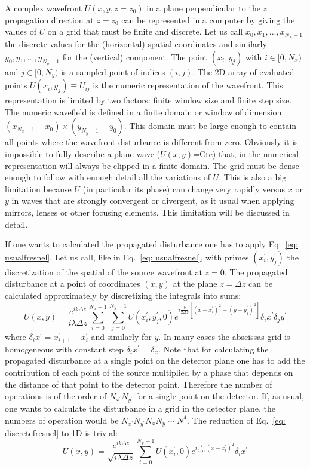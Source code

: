 \documentclass{iucr}              %
\begin{document}
A complex wavefront $U(x,y,z=z_0)$ in a plane perpendicular to the $z$ propagation direction at $z=z_0$ can be represented in a computer by giving the values of $U$ on a grid that must be finite and discrete. Let us call ${x_0,x_1,...,x_{N_x-1}}$ the discrete values for the (horizontal) spatial coordinates and similarly  ${y_0,y_1,...,y_{N_y-1}}$ for the (vertical) component. The point $(x_i,y_j)$ with $i \in [0,N_x)$ and  $j \in [0,N_y)$ is a sampled point of indices $(i,j)$. The 2D array of evaluated points $U(x_i,y_j) \equiv U_{ij}$ is the numeric representation of the wavefront. This representation is limited by two factors: finite window size and finite step size. The numeric wavefield is defined in a finite domain or window of dimension $(x_{N_x-1}-x_0) \times (y_{N_y-1}-y_0)$. This domain must be large enough to contain all points where the wavefront disturbance is different from zero. Obviously it is impossible to fully describe a plane wave ($U(x,y)$=Cte) that, in the numerical representation will always be clipped in a finite domain. The grid must be dense enough to follow with enough detail all the variations of $U$. This is also a big limitation because $U$ (in particular its phase) can change very rapidly versus $x$ or $y$ in waves that are strongly convergent or divergent, as it usual when applying mirrors, lenses or other focusing elements. This limitation will be discussed in detail. 

If one wants to calculated the propagated disturbance one has to apply Eq.~\ref{eq: usualfresnel}. Let us call, like in Eq.~\ref{eq: usualfresnel}, with primes $(x^\prime_i,y^\prime_j)$ the discretization of the spatial of the source wavefront at $z=0$. The propagated disturbance at a point of coordinates $(x,y)$ at the plane $z=\Delta z$ can be calculated approximately by discretizing the integrals into sums: 
\begin{equation}\label{eq: discretefresnel}
 U(x,y) = \frac {e^{ik\Delta z }}{ i \lambda \Delta z} \sum_{i=0}^{N_x-1}  \sum_{j=0}^{N_y-1} U(x^\prime_i, y^\prime_j, 0) e^{i \frac{k}{2 \Delta z} [(x - x_i^\prime)^2 + (y - y_j^\prime)^2]} \delta_i x^\prime \delta_j y^\prime
\end{equation}
where $\delta_i x^\prime = x^\prime_{i+1} - x^\prime_i$ and similarly for $y$. In many cases the abscissas grid is homogeneous with constant step $\delta_i x^\prime = \delta_x$. Note that for calculating the propagated disturbance at a single point on the detector plane one has to add the contribution of each point of the source multiplied by a phase that depends on the distance of that point to the detector point. Therefore the number of operations is of the order of $N_{x^\prime}  N_{y^\prime}$ for a single point on the detector. If, as usual, one wants to calculate the disturbance in a grid in the detector plane, the numbers of operation would be $N_{x^\prime}  N_{y^\prime} N_{x}  N_{y} \sim N^4$. 
The reduction of Eq.~\ref{eq: discretefresnel} to 1D is trivial:
\begin{equation}\label{eq: discretefresnel1D}
 U(x,y) = \frac {e^{ik\Delta z }}{ \sqrt{i \lambda \Delta z}} \sum_{i=0}^{N_x-1}  U(x^\prime_i, 0) e^{i \frac{k}{2 \Delta z} (x - x_i^\prime)^2 } \delta_i x^\prime
\end{equation}
\end{document}
